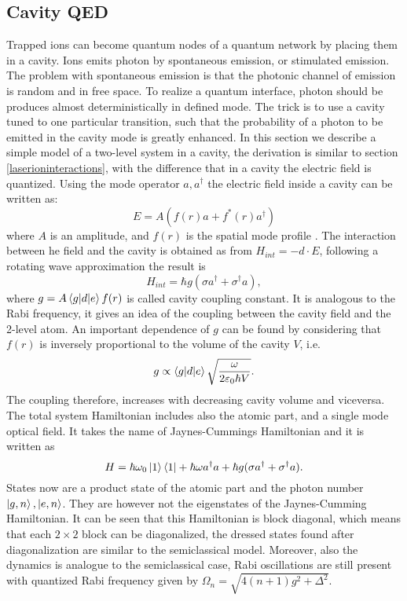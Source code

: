\subsection{Cavity QED}
Trapped ions can become quantum nodes of a quantum network by placing them in a cavity. Ions emits photon by spontaneous emission, or stimulated emission. The problem with spontaneous emission is that the photonic channel of emission is random and in free space. To realize a quantum interface, photon should be produces almost deterministically in defined mode. The trick is to use a cavity tuned to one particular transition, such that the probability of a photon to be emitted in the cavity mode is greatly enhanced. In this section we describe a simple model of a two-level system in a cavity, the derivation is similar to section \ref{laserioninteractions}, with the difference that in a cavity the electric field is quantized. Using the mode operator $a,a^\dagger$ the electric field inside a cavity can be written as:
\begin{equation}
E = A(f(r)a + f^*(r)a^\dagger)
\end{equation}
where $A$ is an amplitude, and $f(r)$ is the spatial mode profile \cite{helene}. The interaction between he field and the cavity is obtained as from $H_{int} = -d\cdot E$, following a rotating wave approximation the result is
\begin{equation}
H_{int} = \hbar g (\sigma a^\dagger + \sigma^\dagger a),
\end{equation}
where $g = A \braket{g|d|e} f(r)$ is called cavity coupling constant. It is analogous to the Rabi frequency, it gives an idea of the coupling between the cavity field and the 2-level atom. An important dependence of $g$ can be found by considering that $f(r)$ is inversely proportional to the volume of the cavity $V$, i.e.
\begin{equation}
g \propto \braket{g|d|e} \sqrt{\frac{\omega}{2\varepsilon_0 \hbar V}}.
\end{equation}
The coupling therefore, increases with decreasing cavity volume and viceversa.\\
The total system Hamiltonian includes also the atomic part, and a single mode optical field. It takes the name of Jaynes-Cummings Hamiltonian and it is written as \cite{qedreview}
\begin{equation}
H = \hbar \omega_0 \ket{1}\bra{1} + \hbar \omega a^\dagger a + \hbar g (\sigma a^\dagger + \sigma^\dagger a).
\end{equation}
States now are a product state of the atomic part and the photon number $\ket{g,n},\ket{e,n}$. They are however not the eigenstates of the Jaynes-Cumming Hamiltonian. It can be seen that this Hamiltonian is block diagonal, which means that each $2\times 2$ block can be diagonalized, the dressed states found after diagonalization are similar to the semiclassical model. Moreover, also the dynamics is analogue to the semiclassical case, Rabi oscillations are still present with quantized Rabi frequency given by $\Omega_n = \sqrt{4(n+1)g^2 +\Delta^2}$.\\
